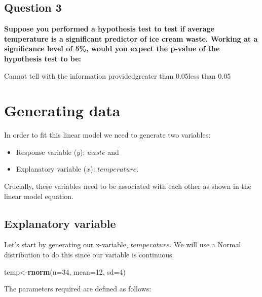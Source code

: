 \documentclass[
]{book}
\newenvironment{Shaded}{\begin{snugshade}}{\end{snugshade}}
\newcommand{\DataTypeTok}[1]{\textcolor[rgb]{0.13,0.29,0.53}{#1}}
\newcommand{\DecValTok}[1]{\textcolor[rgb]{0.00,0.00,0.81}{#1}}
\newcommand{\KeywordTok}[1]{\textcolor[rgb]{0.13,0.29,0.53}{\textbf{#1}}}
\newcommand{\NormalTok}[1]{#1}
\providecommand{\tightlist}{%
  \setlength{\itemsep}{0pt}\setlength{\parskip}{0pt}}
\begin{document}
\hypertarget{question-3}{%
\subsection*{Question 3}\label{question-3}}

\textbf{Suppose you performed a hypothesis test to test if average temperature is a significant predictor of ice cream waste. Working at a significance level of 5\%, would you expect the p-value of the hypothesis test to be:}

Cannot tell with the information providedgreater than 0.05less than 0.05

\hypertarget{generating-data}{%
\section{Generating data}\label{generating-data}}

In order to fit this linear model we need to generate two variables:

\begin{itemize}
\tightlist
\item
  Response variable (\(y\)): \(waste\) and
\item
  Explanatory variable (\(x\)): \(temperature\).
\end{itemize}

Crucially, these variables need to be associated with each other as shown in the linear model equation.

\hypertarget{explanatory-variable}{%
\subsection{Explanatory variable}\label{explanatory-variable}}

Let's start by generating our x-variable, \(temperature\). We will use a Normal distribution to do this since our variable is continuous.

\begin{Shaded}
\begin{Highlighting}[]
\NormalTok{temp<-}\KeywordTok{rnorm}\NormalTok{(}\DataTypeTok{n=}\DecValTok{34}\NormalTok{, }\DataTypeTok{mean=}\DecValTok{12}\NormalTok{, }\DataTypeTok{sd=}\DecValTok{4}\NormalTok{)}
\end{Highlighting}
\end{Shaded}

The parameters required are defined as follows:
\end{document}
